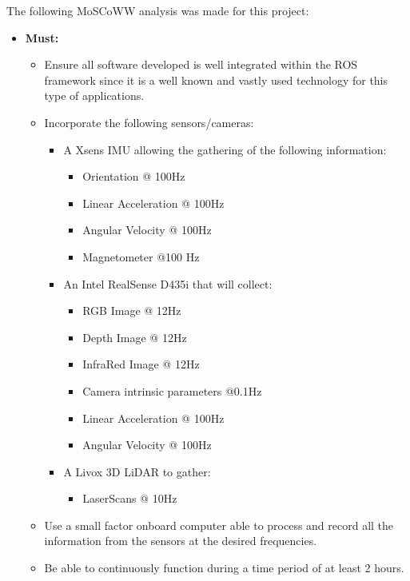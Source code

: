 The following MoSCoWW analysis was made for this project:

\begin{itemize}
    \item \textbf{Must:}
    \begin{itemize}
        \item Ensure all software developed is well integrated within the ROS framework since it is a well known and vastly used technology for this type of applications.
        \item Incorporate the following sensors/cameras:
        \begin{itemize}
            \item A Xsens IMU allowing the gathering of the following information: 
            \begin{itemize}
                \item Orientation @ 100Hz
                \item Linear Acceleration @ 100Hz
                \item Angular Velocity @ 100Hz
                \item Magnetometer @100 Hz
            \end{itemize}
            \item An Intel RealSense D435i that will collect: 
            \begin{itemize}
                \item RGB Image @ 12Hz
                \item Depth Image @ 12Hz
                \item InfraRed Image @ 12Hz
                \item Camera intrinsic parameters @0.1Hz
                \item Linear Acceleration @ 100Hz
                \item Angular Velocity @ 100Hz
            \end{itemize}
            \item A Livox 3D LiDAR to gather:
            \begin{itemize}
                \item LaserScans @ 10Hz\
            \end{itemize}
        \end{itemize}
        \item Use a small factor onboard computer able to process and record all the information from the sensors at the desired frequencies.
        \item Be able to continuously function during a time period of at least 2 hours.

\end{itemize}
\end{itemize}
